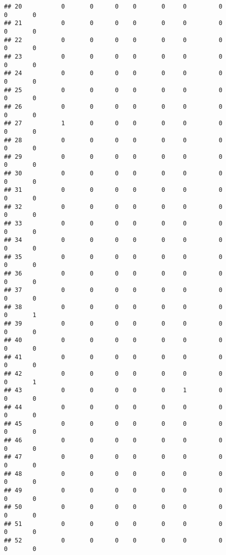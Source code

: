 \documentclass[
]{article}
\begin{document}
\begin{verbatim}
## 20           0       0      0    0       0     0         0          0       0
## 21           0       0      0    0       0     0         0          0       0
## 22           0       0      0    0       0     0         0          0       0
## 23           0       0      0    0       0     0         0          0       0
## 24           0       0      0    0       0     0         0          0       0
## 25           0       0      0    0       0     0         0          0       0
## 26           0       0      0    0       0     0         0          0       0
## 27           1       0      0    0       0     0         0          0       0
## 28           0       0      0    0       0     0         0          0       0
## 29           0       0      0    0       0     0         0          0       0
## 30           0       0      0    0       0     0         0          0       0
## 31           0       0      0    0       0     0         0          0       0
## 32           0       0      0    0       0     0         0          0       0
## 33           0       0      0    0       0     0         0          0       0
## 34           0       0      0    0       0     0         0          0       0
## 35           0       0      0    0       0     0         0          0       0
## 36           0       0      0    0       0     0         0          0       0
## 37           0       0      0    0       0     0         0          0       0
## 38           0       0      0    0       0     0         0          0       1
## 39           0       0      0    0       0     0         0          0       0
## 40           0       0      0    0       0     0         0          0       0
## 41           0       0      0    0       0     0         0          0       0
## 42           0       0      0    0       0     0         0          0       1
## 43           0       0      0    0       0     1         0          0       0
## 44           0       0      0    0       0     0         0          0       0
## 45           0       0      0    0       0     0         0          0       0
## 46           0       0      0    0       0     0         0          0       0
## 47           0       0      0    0       0     0         0          0       0
## 48           0       0      0    0       0     0         0          0       0
## 49           0       0      0    0       0     0         0          0       0
## 50           0       0      0    0       0     0         0          0       0
## 51           0       0      0    0       0     0         0          0       0
## 52           0       0      0    0       0     0         0          0       0

\end{verbatim}
\end{document}
